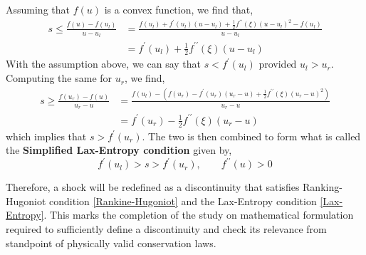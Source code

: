 \documentclass[11pt, a4paper]{report}
\begin{document}
Assuming that $f(u)$ is a convex function, we find that,
\begin{equation*}
    \begin{split}
        s \leq \frac{f(u) - f\left(u_{l}\right)}{u - u_{l}} & = \frac{f\left(u_{l}\right) + f^{\prime}\left(u_{l}\right)\left(u - u_{l}\right) + \frac {1}{2}f^{\prime\prime}(\xi)\left(u - u_{l}\right)^{2} - f\left(u_{l}\right)}{u - u_{l}}\\
         & = f^{\prime}\left(u_{l}\right) + \frac{1}{2}f^{\prime\prime}(\xi)\left(u - u_{l}\right)
    \end{split}
\end{equation*} 
With the assumption above, we can say that $s < f^{\prime}(u_l)$ provided $u_l > u_r$. Computing the same for $u_r$,
we find,
\begin{equation*}
    \begin{split}
        s \geq \frac{f(u_{r}) - f\left(u\right)}{u_{r} - u} & = \frac{f\left(u_{l}\right) - \left(f\left(u_{r}\right) - f^{\prime}\left(u_{r}\right)\left(u_{r} - u\right) + \frac{1}{2}f^{\prime\prime}(\xi)\left(u_{r} - u\right)^{2}\right)}{u_{r} - u}\\
         & = f^{\prime}\left(u_{r}\right) - \frac{1}{2}f^{\prime\prime}(\xi)\left(u_{r} - u\right)
    \end{split}
\end{equation*} 
which implies that $s > f^{\prime}(u_r)$. The two is then combined to form what is called the {\bfseries Simplified
Lax-Entropy condition} given by,
\begin{equation} \label{Lax-Entropy}
    f^{\prime}\left(u_{l}\right) > s > f^{\prime}\left(u_{r}\right), \qquad f^{\prime\prime}(u) > 0
\end{equation}

Therefore, a shock will be redefined as a discontinuity that satisfies Ranking-Hugoniot condition 
\eqref{Rankine-Hugoniot} and the Lax-Entropy condition \eqref{Lax-Entropy}. This marks the completion of the study 
on mathematical formulation required to sufficiently define a discontinuity and check its relevance from standpoint 
of physically valid conservation laws. 



\end{document}
